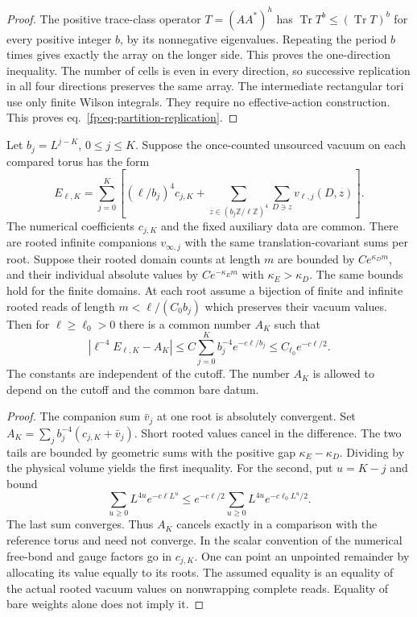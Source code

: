 \documentclass[11pt,letterpaper,reqno]{amsart}
\makeatletter
\numberwithin{equation}{section}
\renewcommand{\eqref}[1]{\textup{eq.~\ref{#1}}}
\theoremstyle{definition}
\newcommand{\ms@minorstart}{%
  \pushQED{\qed}\renewcommand{\qedsymbol}{$\blacksquare$}}
\newenvironment{lemma}[1][]{\ms@minorstart\ms@lemma[#1]}
  {\popQED\endms@lemma}
\theoremstyle{remark}
\makeatother
\begin{document}
\begin{proof}
The positive trace-class operator $T=(AA^*)^h$ has
$\operatorname{Tr}T^b\le(\operatorname{Tr}T)^b$ for every
positive integer $b$, by its nonnegative eigenvalues. Repeating
the period $b$ times gives exactly the array on the longer side.
This proves the one-direction inequality. The number of cells
is even in every direction, so successive replication in all
four directions preserves the same array. The intermediate
rectangular tori use only finite Wilson integrals. They require
no effective-action construction. This proves
\eqref{fp:eq-partition-replication}.
\end{proof}

\begin{lemma}[Comparison of vacuum densities]
\label{fp:lem-vacuum-density}
Let $b_j=L^{j-K}$, $0\le j\le K$. Suppose the once-counted
unsourced vacuum on each compared torus has the form
\[
 E_{\ell,K}=\sum_{j=0}^K\left[
 (\ell/b_j)^4 c_{j,K}
 +\sum_{z\in (b_j\mathbb Z/\ell\mathbb Z)^4}
                \sum_{D\ni z}v_{\ell,j}(D,z)\right].
\]
The numerical coefficients $c_{j,K}$ and the fixed auxiliary
data are common. There are rooted infinite companions
$v_{\infty,j}$ with the same translation-covariant sums per
root. Suppose their rooted domain counts at length $m$ are
bounded by $C e^{\kappa_D m}$, and their individual absolute
values by $C e^{-\kappa_E m}$ with $\kappa_E>\kappa_D$.
The same bounds hold for the finite domains. At each root
assume a bijection of finite and infinite rooted reads of length
$m<\ell/(C_0b_j)$ which preserves their vacuum values.
Then for $\ell\ge\ell_0>0$ there is a common number $A_K$
such that
\begin{equation}\label{fp:eq-vacuum-density}
 \left|\ell^{-4}E_{\ell,K}-A_K\right|
 \le C\sum_{j=0}^K b_j^{-4}e^{-c\ell/b_j}
 \le C_{\ell_0}e^{-c\ell/2}.
\end{equation}
The constants are independent of the cutoff. The number $A_K$
is allowed to depend on the cutoff and the common bare datum.
\end{lemma}

\begin{proof}
The companion sum $\bar v_j$ at one root is absolutely
convergent. Set $A_K=\sum_j b_j^{-4}(c_{j,K}+\bar v_j)$.
Short rooted values cancel in the difference. The two tails
are bounded by geometric sums with the positive gap
$\kappa_E-\kappa_D$. Dividing by the physical volume yields
the first inequality. For the second, put $u=K-j$ and bound
\[
 \sum_{u\ge0} L^{4u}e^{-c\ell L^u}
 \le e^{-c\ell/2}
              \sum_{u\ge0}L^{4u}e^{-c\ell_0L^u/2}.
\]
The last sum converges. Thus $A_K$ cancels exactly in a
comparison with the reference torus and need not converge.
In the scalar convention of \cite[Proposition~2.5]{RT} the numerical free-bond and
gauge factors go in $c_{j,K}$. One can point an unpointed
remainder by allocating its value equally to its roots.
The assumed equality is an equality of the actual rooted
vacuum values on nonwrapping complete reads. Equality of
bare weights alone does not imply it.
\end{proof}
\end{document}
